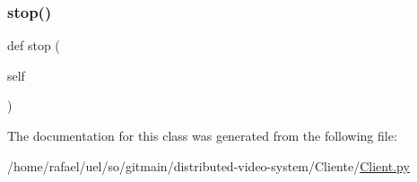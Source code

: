 \mbox{\label{class_client_1_1_client_producer_video_a26ca7c1c7fcdd35378e7be97727047a6}} 
\subsubsection{\texorpdfstring{stop()}{stop()}}
{\footnotesize\ttfamily def stop (\begin{DoxyParamCaption}\item[{}]{self }\end{DoxyParamCaption})}



The documentation for this class was generated from the following file\+:\begin{DoxyCompactItemize}
\item 
/home/rafael/uel/so/gitmain/distributed-\/video-\/system/\+Cliente/\hyperlink{_client_8py}{Client.\+py}\end{DoxyCompactItemize}
